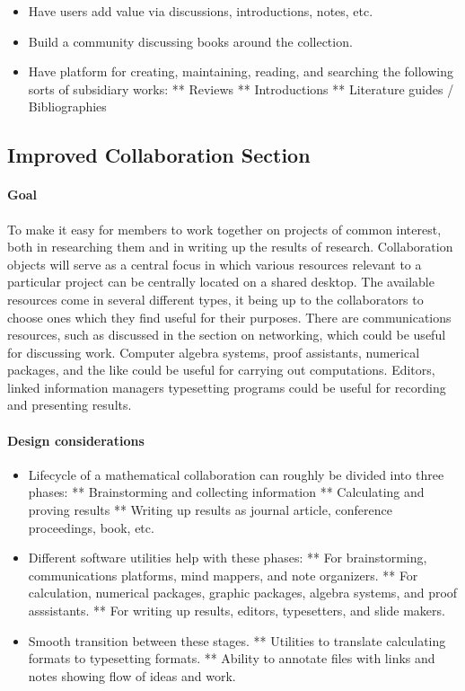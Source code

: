 \begin{itemize}
\item
  Have users add value via discussions, introductions, notes, etc.
\item
  Build a community discussing books around the collection.
\item
  Have platform for creating, maintaining, reading, and searching the
  following sorts of subsidiary works: ** Reviews ** Introductions **
  Literature guides / Bibliographies
\end{itemize}

\subsection{Improved Collaboration Section}

\paragraph{Goal} To make it easy for members to work together on projects of common
interest, both in researching them and in writing up the results of
research. Collaboration objects will serve as a central focus in which
various resources relevant to a particular project can be centrally
located on a shared desktop. The available resources come in several
different types, it being up to the collaborators to choose ones which
they find useful for their purposes. There are communications resources,
such as discussed in the section on networking, which could be useful
for discussing work. Computer algebra systems, proof assistants,
numerical packages, and the like could be useful for carrying out
computations. Editors, linked information managers typesetting programs
could be useful for recording and presenting results.

\paragraph{Design considerations}

\begin{itemize}
\item
  Lifecycle of a mathematical collaboration can roughly be divided into
  three phases: ** Brainstorming and collecting information **
  Calculating and proving results ** Writing up results as journal
  article, conference proceedings, book, etc.
\item
  Different software utilities help with these phases: ** For
  brainstorming, communications platforms, mind mappers, and note
  organizers. ** For calculation, numerical packages, graphic packages,
  algebra systems, and proof asssistants. ** For writing up results,
  editors, typesetters, and slide makers.
\item
  Smooth transition between these stages. ** Utilities to translate
  calculating formats to typesetting formats. ** Ability to annotate
  files with links and notes showing flow of ideas and work.
\end{itemize}

